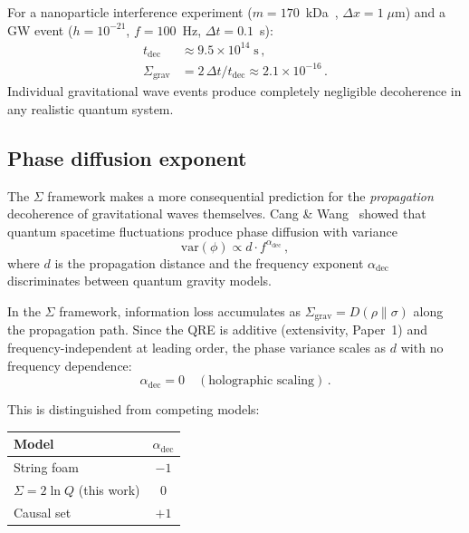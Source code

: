 \documentclass[prl,twocolumn,superscriptaddress,longbibliography]{revtex4-2}
\newcommand{\Sgrav}{\Sigma_{\mathrm{grav}}}
\begin{document}
For a nanoparticle interference experiment
($m = 170$~kDa~\cite{Pedalino2026},
$\Delta x = 1\;\mu$m) and a GW event
($h = 10^{-21}$, $f = 100$~Hz, $\Delta t = 0.1$~s):
\begin{align}
  t_{\mathrm{dec}} &\approx 9.5 \times 10^{14}\;\mathrm{s}\,,
  \nonumber \\
  \Sgrav &= 2\,\Delta t / t_{\mathrm{dec}}
  \approx 2.1 \times 10^{-16}\,.
  \label{eq:Sigma_GW}
\end{align}
Individual gravitational wave events produce completely
negligible decoherence in any realistic quantum system.

\subsection{Phase diffusion exponent}

The $\Sigma$ framework makes a more consequential prediction for
the \emph{propagation} decoherence of gravitational waves
themselves.  Cang \& Wang~\cite{CangWang2025} showed that
quantum spacetime fluctuations produce phase diffusion with
variance
\begin{equation}
  \mathrm{var}(\phi) \propto d \cdot f^{\alpha_{\mathrm{dec}}}\,,
  \label{eq:phase_diffusion}
\end{equation}
where $d$ is the propagation distance and the frequency exponent
$\alpha_{\mathrm{dec}}$ discriminates between quantum gravity
models.

In the $\Sigma$ framework, information loss accumulates as
$\Sgrav = D(\rho \| \sigma)$ along the propagation path.
Since the QRE is additive (extensivity, Paper~1) and
frequency-independent at leading order, the phase variance
scales as $d$ with no frequency dependence:
\begin{equation}
  \boxed{\alpha_{\mathrm{dec}} = 0
  \quad(\text{holographic scaling})}\,.
  \label{eq:alpha_dec}
\end{equation}

This is distinguished from competing models:
\begin{center}
\begin{tabular}{lc}
\toprule
Model & $\alpha_{\mathrm{dec}}$ \\
\midrule
String foam & $-1$ \\
$\Sigma = 2\ln Q$ (this work) & $0$ \\
Causal set & $+1$ \\
\bottomrule
\end{tabular}
\end{center}
\end{document}
